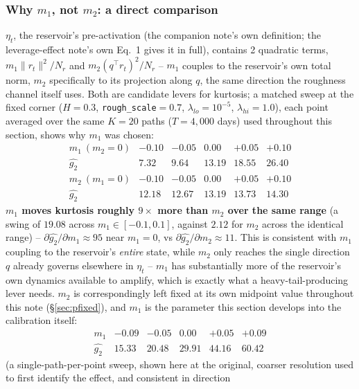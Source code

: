 \documentclass[11pt]{article}
\begin{document}
\subsubsection{Why $m_1$, not $m_2$: a direct comparison}
$\eta_t$, the reservoir's pre-activation (the companion note's own
definition; the leverage-effect note's own Eq.~1 gives it in full), contains
2 quadratic terms, $m_1\lVert r_t\rVert^2/N_r$ and $m_2(q^\top r_t)^2/N_r$ --
$m_1$ couples to the reservoir's own total norm, $m_2$ specifically to its
projection along $q$, the same direction the roughness channel itself uses.
Both are candidate levers for kurtosis; a matched sweep at the fixed corner
($H=0.3$, \texttt{rough\_scale}$=0.7$, $\lambda_{lo}=10^{-5}$,
$\lambda_{hi}=1.0$), each point averaged over the same $K=20$ paths
($T=4{,}000$ days) used throughout this section, shows why $m_1$ was chosen:
\[
\begin{array}{lccccc}
m_1\ (m_2=0) & -0.10 & -0.05 & 0.00 & +0.05 & +0.10 \\
\widehat{g_2} & 7.32 & 9.64 & 13.19 & 18.55 & 26.40
\end{array}
\]
\[
\begin{array}{lccccc}
m_2\ (m_1=0) & -0.10 & -0.05 & 0.00 & +0.05 & +0.10 \\
\widehat{g_2} & 12.18 & 12.67 & 13.19 & 13.73 & 14.30
\end{array}
\]
\textbf{$m_1$ moves kurtosis roughly $9\times$ more than $m_2$ over the same
range} (a swing of $19.08$ across $m_1\in[-0.1,0.1]$, against $2.12$ for
$m_2$ across the identical range) -- $\partial\widehat{g_2}/\partial m_1
\approx95$ near $m_1=0$, vs $\partial\widehat{g_2}/\partial m_2\approx11$.
This is consistent with $m_1$ coupling to the reservoir's \emph{entire}
state, while $m_2$ only reaches the single direction $q$ already governs
elsewhere in $\eta_t$ -- $m_1$ has substantially more of the reservoir's own
dynamics available to amplify, which is exactly what a heavy-tail-producing
lever needs. $m_2$ is correspondingly left fixed at its own midpoint value
throughout this note (\S\ref{sec:pfixed}), and $m_1$ is the parameter this
section develops into the calibration itself:
\[
\begin{array}{lccccc}
m_1 & -0.09 & -0.05 & 0.00 & +0.05 & +0.09 \\
\widehat{g_2} & 15.33 & 20.48 & 29.91 & 44.16 & 60.42
\end{array}
\]
(a single-path-per-point sweep, shown here at the original, coarser
resolution used to first identify the effect, and consistent in direction
\end{document}
